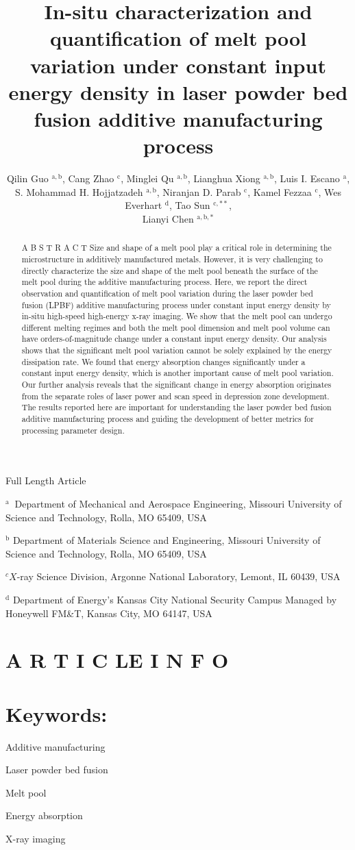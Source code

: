 \documentclass[10pt]{article}
\title{In-situ characterization and quantification of melt pool variation under constant input energy density in laser powder bed fusion additive manufacturing process }
\author{Qilin Guo ${ }^{\mathrm{a}, \mathrm{b}}$, Cang Zhao ${ }^{\mathrm{c}}$, Minglei Qu ${ }^{\mathrm{a}, \mathrm{b}}$, Lianghua Xiong ${ }^{\mathrm{a}, \mathrm{b}}$, Luis I. Escano ${ }^{\mathrm{a}}$,\\
S. Mohammad H. Hojjatzadeh ${ }^{\mathrm{a}, \mathrm{b}}$, Niranjan D. Parab ${ }^{\mathrm{c}}$, Kamel Fezzaa ${ }^{\mathrm{c}}$, Wes Everhart ${ }^{\mathrm{d}}$, Tao Sun ${ }^{\mathrm{c}, * *}$,\\
Lianyi Chen ${ }^{\mathrm{a}, \mathrm{b}, *}$}
\date{}
\begin{document}
\maketitle
Full Length Article

${ }^{\text {a }}$ Department of Mechanical and Aerospace Engineering, Missouri University of Science and Technology, Rolla, MO 65409, USA

${ }^{\mathrm{b}}$ Department of Materials Science and Engineering, Missouri University of Science and Technology, Rolla, MO 65409, USA

${ }^{c} X$-ray Science Division, Argonne National Laboratory, Lemont, IL 60439, USA

${ }^{\mathrm{d}}$ Department of Energy's Kansas City National Security Campus Managed by Honeywell FM\&T, Kansas City, MO 64147, USA

\section*{A R T I C LE I N F O}
\section*{Keywords:}
Additive manufacturing

Laser powder bed fusion

Melt pool

Energy absorption

X-ray imaging

\begin{abstract}
A B S T R A C T Size and shape of a melt pool play a critical role in determining the microstructure in additively manufactured metals. However, it is very challenging to directly characterize the size and shape of the melt pool beneath the surface of the melt pool during the additive manufacturing process. Here, we report the direct observation and quantification of melt pool variation during the laser powder bed fusion (LPBF) additive manufacturing process under constant input energy density by in-situ high-speed high-energy x-ray imaging. We show that the melt pool can undergo different melting regimes and both the melt pool dimension and melt pool volume can have orders-of-magnitude change under a constant input energy density. Our analysis shows that the significant melt pool variation cannot be solely explained by the energy dissipation rate. We found that energy absorption changes significantly under a constant input energy density, which is another important cause of melt pool variation. Our further analysis reveals that the significant change in energy absorption originates from the separate roles of laser power and scan speed in depression zone development. The results reported here are important for understanding the laser powder bed fusion additive manufacturing process and guiding the development of better metrics for processing parameter design.
\end{abstract}
\end{document}
